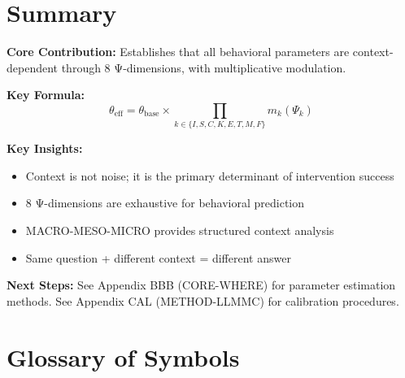 \section{Summary}
\label{sec:when-summary}

\begin{tcolorbox}[colback=gray!5!white, colframe=gray!75!black,
    title=Appendix V Summary: CORE-WHEN]

\textbf{Core Contribution:}
Establishes that all behavioral parameters are context-dependent through
8 Ψ-dimensions, with multiplicative modulation.

\textbf{Key Formula:}
\begin{equation}
\theta_{\text{eff}} = \theta_{\text{base}} \times \prod_{k \in \{I,S,C,K,E,T,M,F\}} m_k(\Psi_k)
\end{equation}

\textbf{Key Insights:}
\begin{itemize}[nosep]
\item Context is not noise; it is the primary determinant of intervention success
\item 8 Ψ-dimensions are exhaustive for behavioral prediction
\item MACRO-MESO-MICRO provides structured context analysis
\item Same question + different context = different answer
\end{itemize}

\textbf{Next Steps:}
See Appendix BBB (CORE-WHERE) for parameter estimation methods.
See Appendix CAL (METHOD-LLMMC) for calibration procedures.

\end{tcolorbox}


\section{Glossary of Symbols}
\label{sec:when-glossary}

